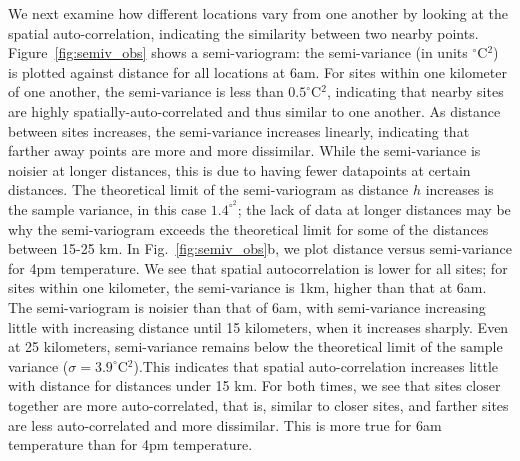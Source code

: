 We next examine how different locations vary from one another by looking at the spatial auto-correlation, indicating the similarity between two nearby points. Figure~\ref{fig:semiv_obs} shows a semi-variogram: the semi-variance (in units $^\circ$C$^2$) is plotted against distance for all locations at 6am. For sites within one kilometer of one another, the semi-variance is less than $0.5^\circ$C$^2$, indicating that nearby sites are highly spatially-auto-correlated and thus similar to one another. 
As distance between sites increases, the semi-variance increases linearly, indicating that farther away points are more and more dissimilar. While the semi-variance is noisier at longer distances, this is due to having fewer datapoints at certain distances. 
The theoretical limit of the semi-variogram as distance $h$ increases is the sample variance, in this case $1.4^{\circ^2}$; the lack of data at longer distances may be why the semi-variogram exceeds the theoretical limit for some of the distances between 15-25 km. 
In Fig.~\ref{fig:semiv_obs}b, we plot distance versus semi-variance for 4pm temperature. We see that spatial autocorrelation is lower for all sites; for sites within one kilometer, the semi-variance is 1km, higher than that at 6am. The semi-variogram is noisier than that of 6am, with semi-variance increasing little with increasing distance until 15 kilometers, when it increases sharply. Even at 25 kilometers, semi-variance remains below the theoretical limit of the sample variance ($\sigma = 3.9^\circ$C$^2$).This indicates that spatial auto-correlation increases little with distance for distances under 15 km.
For both times, we see that sites closer together are more auto-correlated, that is, similar to closer sites, and farther sites are less auto-correlated and more dissimilar. This is more true for 6am temperature than for 4pm temperature. 

